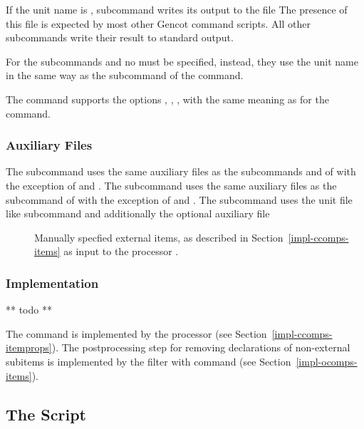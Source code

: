 If the unit name is , subcommand  writes its output to the file 
The presence of this file is expected by most other Gencot command scripts. All other subcommands write their result to 
standard output.

For the subcommands  and  no  must be specified, instead, they use the unit name
in the same way as the subcommand  of the  command.

The  command supports the options , , ,  with the same meaning as
for the  command.

\subsubsection{Auxiliary Files}

The subcommand  uses the same auxiliary files as the subcommands  and  of  with
the exception of  and .
The subcommand  uses the same auxiliary files as the subcommand  of  with the exception
of  and .
The subcommand  uses the unit file  like subcommand  and additionally
the optional auxiliary file 
\begin{description}
\item[] Manually specfied external items, as described in Section~\ref{impl-ccomps-items} as
input to the processor .
\end{description}

\subsubsection{Implementation}

** todo **

The  command is implemented by the processor  (see Section~\ref{impl-ccomps-itemprops}). 
The postprocessing step for removing declarations of non-external subitems is implemented by the filter
 with command  (see Section~\ref{impl-ocomps-items}).

\subsection{The  Script}
\label{impl-all-parmod}

